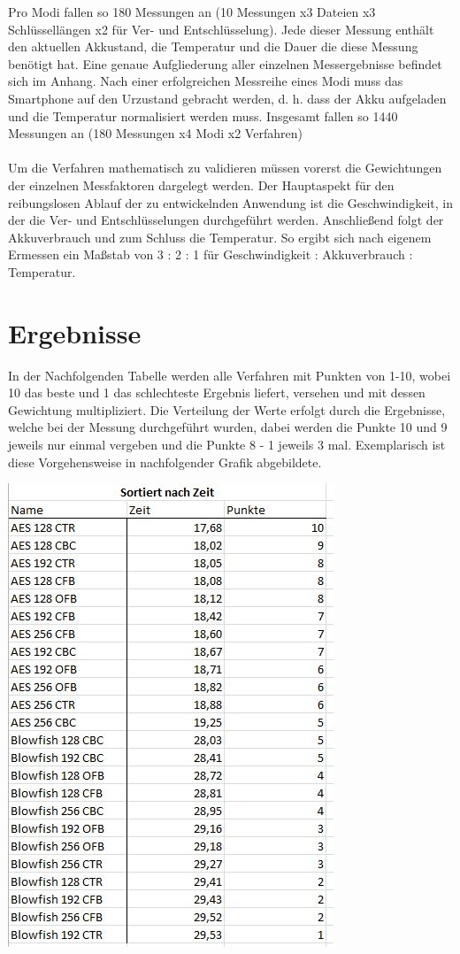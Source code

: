 \documentclass[10pt, a4paper,headsepline]{scrreprt}
\begin{document}
Pro Modi fallen so 180 Messungen an (10 Messungen x3 Dateien x3 Schlüssellängen x2 für Ver- und Entschlüsselung). Jede dieser Messung enthält den aktuellen Akkustand, die Temperatur und die Dauer die diese Messung benötigt hat. Eine genaue Aufgliederung aller einzelnen Messergebnisse befindet sich im Anhang. Nach einer erfolgreichen Messreihe eines Modi muss das Smartphone auf den Urzustand gebracht werden, d. h. dass der Akku aufgeladen und die Temperatur normalisiert werden muss. Insgesamt fallen so 1440 Messungen an (180 Messungen x4 Modi x2 Verfahren)\\ \\
Um die Verfahren mathematisch zu validieren müssen vorerst die Gewichtungen der einzelnen Messfaktoren dargelegt werden. Der Hauptaspekt für den reibungslosen Ablauf der zu entwickelnden Anwendung ist die Geschwindigkeit, in der die Ver- und Entschlüsselungen durchgeführt werden. Anschließend folgt der Akkuverbrauch und zum Schluss die Temperatur. So ergibt sich nach eigenem Ermessen ein Maßstab von 3 : 2 : 1 für Geschwindigkeit : Akkuverbrauch : Temperatur. 


\section{Ergebnisse}
In der Nachfolgenden Tabelle werden alle Verfahren mit Punkten von 1-10, wobei 10 das beste und 1 das schlechteste Ergebnis liefert, versehen und mit dessen Gewichtung multipliziert. Die Verteilung der Werte erfolgt durch die Ergebnisse, welche bei der Messung durchgeführt wurden, dabei werden die Punkte 10 und 9 jeweils nur einmal vergeben und die Punkte 8 - 1 jeweils 3 mal. Exemplarisch ist diese Vorgehensweise in nachfolgender Grafik abgebildete. 

\includegraphics[scale=0.9]{tabelle_zeitvergleich_punkte.JPG}
\hfill
\end{document}
